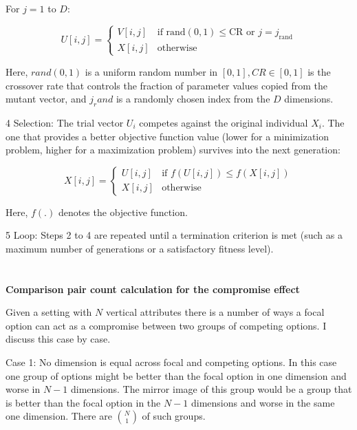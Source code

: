 \documentclass[a4paper,12pt]{article}
\begin{document}
    For $j = 1$ to $D$:
    
    $$
        U[i, j] =
        \begin{cases}
            V[i, j] & \text{if } \text{rand}(0,1) \leq \text{CR} \text{ or } j = j_{\text{rand}} \\
            X[i, j] & \text{otherwise}
        \end{cases}
    $$

Here, $rand(0,1)$ is a uniform random number in $[0,1], CR \in [0,1]$ is the crossover rate that controls the fraction of parameter values copied from the mutant vector, and $j_rand$ is a randomly chosen index from the $D$ dimensions.

4 Selection: The trial vector $U_i$ competes against the original individual $X_i$. The one that provides a better objective function value (lower for a minimization problem, higher for a maximization problem) survives into the next generation:

        $$
        X[i, j] =
        \begin{cases}
            U[i, j] & \text{if } f(U[i, j]) \leq f(X[i, j]) \\
            X[i, j] & \text{otherwise}
        \end{cases}
        $$

Here, $f(.)$ denotes the objective function.

5 Loop: Steps 2 to 4 are repeated until a termination criterion is met (such as a maximum number of generations or a satisfactory fitness level).



\clearpage
\section{}\label{appendix:compromiseCalculation}

\textbf{Comparison pair count calculation for the compromise effect}

Given a setting with $N$ vertical attributes there is a number of ways a focal option can act as a compromise between two groups of competing options.
I discuss this case by case.

Case 1: No dimension is equal across focal and competing options. In this case one group of options might be better than the focal option in one dimension and worse in $N-1$ dimensions. The mirror image of this group would be a group that is better than the focal option in the $N-1$ dimensions and worse in the same one dimension. There are $\binom{N}{1}$ of such groups.
\end{document}
